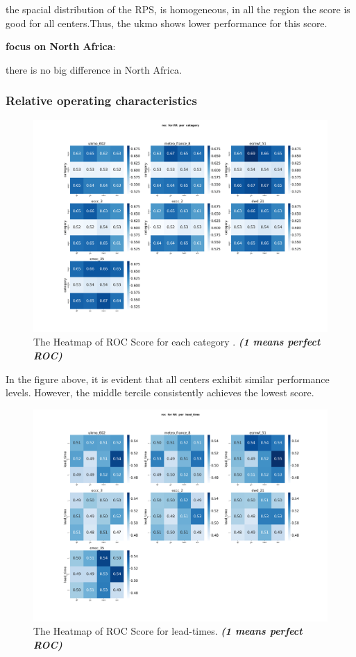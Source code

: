 the spacial distribution of the RPS, is homogeneous, in all the region the score is good for all centers.Thus, the ukmo shows lower performance for this score.

\vspace{1.5cm}
\textbf{focus on North Africa}:

there is no big difference in North Africa.

\subsubsection{Relative operating characteristics}

\begin{figure}[H]
    \centering
    \includegraphics[scale=0.25]{plots/prob/roc/roc_RR_category.png}
    \caption{The Heatmap of ROC Score for each category  . \textbf{\textit{(1 means perfect ROC)}}}
\end{figure}

In the figure above, it is evident that all centers exhibit similar performance levels. However, the middle tercile consistently achieves the lowest score.
\begin{figure}[H]
    \centering
    \includegraphics[scale=0.25]{plots/prob/roc/roc_RR_lead_time.png}
    \caption{The Heatmap of ROC Score for lead-times. \textbf{\textit{(1 means perfect ROC)}}}
\end{figure}

